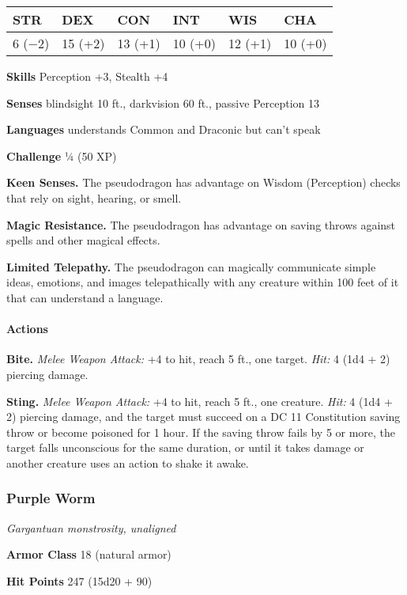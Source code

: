 \documentclass[
]{article}
\begin{document}
\begin{longtable}[]{@{}llllll@{}}
\toprule
STR & DEX & CON & INT & WIS & CHA\tabularnewline
\midrule
\endhead
6 (−2) & 15 (+2) & 13 (+1) & 10 (+0) & 12 (+1) & 10 (+0)\tabularnewline
\bottomrule
\end{longtable}

\textbf{Skills} Perception +3, Stealth +4

\textbf{Senses} blindsight 10 ft., darkvision 60 ft., passive Perception
13

\textbf{Languages} understands Common and Draconic but can't speak

\textbf{Challenge} ¼ (50 XP)

\textbf{Keen Senses.} The pseudodragon has advantage on Wisdom
(Perception) checks that rely on sight, hearing, or smell.

\textbf{Magic Resistance.} The pseudodragon has advantage on saving
throws against spells and other magical effects.

\textbf{Limited Telepathy.} The pseudodragon can magically communicate
simple ideas, emotions, and images telepathically with any creature
within 100 feet of it that can understand a language.

\hypertarget{actions-1}{%
\paragraph{Actions}\label{actions-1}}

\textbf{Bite.} \emph{Melee Weapon Attack:} +4 to hit, reach 5 ft., one
target. \emph{Hit:} 4 (1d4 + 2) piercing damage.

\textbf{Sting.} \emph{Melee Weapon Attack:} +4 to hit, reach 5 ft., one
creature. \emph{Hit:} 4 (1d4 + 2) piercing damage, and the target must
succeed on a DC 11 Constitution saving throw or become poisoned for 1
hour. If the saving throw fails by 5 or more, the target falls
unconscious for the same duration, or until it takes damage or another
creature uses an action to shake it awake.

\hypertarget{purple-worm}{%
\subsubsection{Purple Worm}\label{purple-worm}}

\emph{Gargantuan monstrosity, unaligned}

\textbf{Armor Class} 18 (natural armor)

\textbf{Hit Points} 247 (15d20 + 90)
\end{document}
